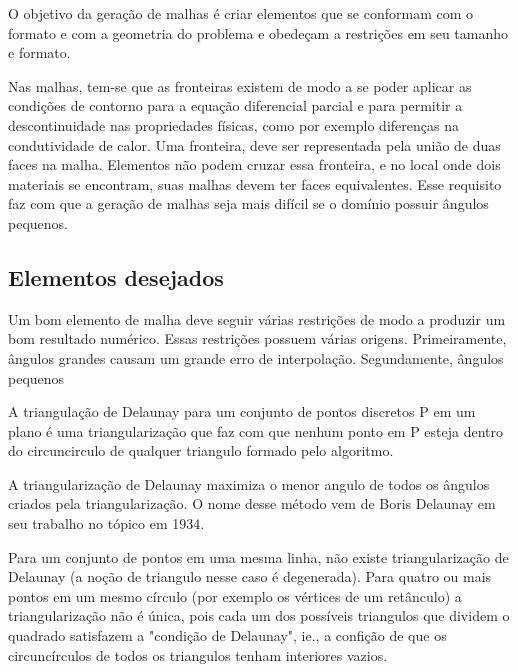 O objetivo da geração de malhas é criar elementos que se conformam com o formato e com a geometria do problema e obedeçam a restrições em seu tamanho e formato.

Nas malhas, tem-se que as fronteiras existem de modo a se poder aplicar as condições de contorno para a equação diferencial parcial e para permitir a descontinuidade nas propriedades físicas, como por exemplo diferenças na condutividade de calor. Uma fronteira, deve ser representada pela união de duas faces na malha. Elementos não podem cruzar essa fronteira, e no local onde dois materiais se encontram, suas malhas devem ter faces equivalentes. Esse requisito faz com que a geração de malhas seja mais difícil se o domínio possuir ângulos pequenos.

\subsection{Elementos desejados}
Um bom elemento de malha deve seguir várias restrições de modo a produzir um bom resultado numérico. Essas restrições possuem várias origens. Primeiramente, ângulos grandes causam um grande erro de interpolação. Segundamente, ângulos pequenos 


A triangulação de Delaunay para um conjunto de pontos discretos P em um plano é uma triangularização que faz com que nenhum ponto em P esteja dentro do circuncirculo de qualquer triangulo formado pelo algoritmo.

A triangularização de Delaunay maximiza o menor angulo de todos os ângulos criados pela triangularização. O nome desse método vem de Boris Delaunay em seu trabalho no tópico em 1934.

Para um conjunto de pontos em uma mesma linha, não existe triangularização de Delaunay (a noção de triangulo nesse caso é degenerada). Para quatro ou mais pontos em um mesmo círculo (por exemplo os vértices de um retânculo) a triangularização não é única, pois cada um dos possíveis triangulos que dividem o quadrado satisfazem a "condição de Delaunay", ie., a confição de que os circuncírculos de todos os triangulos tenham interiores vazios.